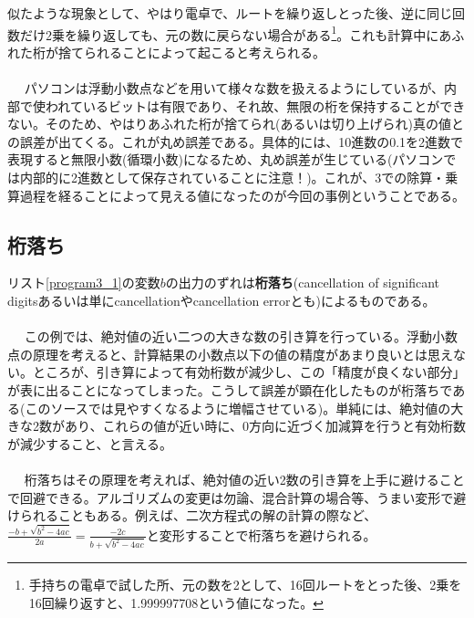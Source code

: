 似たような現象として、やはり電卓で、ルートを繰り返しとった後、逆に同じ回数だけ2乗を繰り返しても、元の数に戻らない場合がある\footnote{手持ちの電卓で試した所、元の数を2として、16回ルートをとった後、2乗を16回繰り返すと、1.999997708という値になった。}。これも計算中にあふれた桁が捨てられることによって起こると考えられる。
\\ \\　
パソコンは浮動小数点などを用いて様々な数を扱えるようにしているが、内部で使われているビットは有限であり、それ故、無限の桁を保持することができない。そのため、やはりあふれた桁が捨てられ(あるいは切り上げられ)真の値との誤差が出てくる。これが丸め誤差である。具体的には、10進数の0.1を2進数で表現すると無限小数(循環小数)になるため、丸め誤差が生じている(パソコンでは内部的に2進数として保存されていることに注意！)。これが、3での除算・乗算過程を経ることによって見える値になったのが今回の事例ということである。

\subsection{桁落ち}
リスト\ref{program3_1}の変数$b$の出力のずれは\textbf{桁落ち}(cancellation of significant digitsあるいは単にcancellationやcancellation errorとも)によるものである。
\\ \\　
この例では、絶対値の近い二つの大きな数の引き算を行っている。浮動小数点の原理を考えると、計算結果の小数点以下の値の精度があまり良いとは思えない。ところが、引き算によって有効桁数が減少し、この「精度が良くない部分」が表に出ることになってしまった。こうして誤差が顕在化したものが桁落ちである(このソースでは見やすくなるように増幅させている)。単純には、絶対値の大きな2数があり、これらの値が近い時に、0方向に近づく加減算を行うと有効桁数が減少すること、と言える。
\\ \\　
桁落ちはその原理を考えれば、絶対値の近い2数の引き算を上手に避けることで回避できる。アルゴリズムの変更は勿論、混合計算の場合等、うまい変形で避けられることもある。例えば、二次方程式の解の計算の際など、$\frac{-b+\sqrt{b^2-4ac}}{2a}=\frac{-2c}{b+\sqrt{b^2-4ac}}$と変形することで桁落ちを避けられる。

